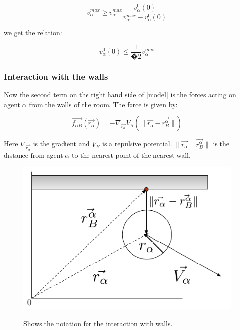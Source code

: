 \begin{equation}
	v_{\alpha}^{max} 
	\geq 
	v_{\alpha}^{max} 
	\frac{v_{\alpha}^{0}(0)}{v_{\alpha}^{max}-v_{\alpha}^{0}(0)}
\end{equation}

we get the relation:

\begin{equation}
v_{\alpha}^{0}(0)\leq \frac{1}{�2}v_{\alpha}^{max}
\end{equation}


\subsubsection{Interaction with the walls}
Now the second term on the right hand side of \eqref{model} is the forces acting on agent 
$\alpha$ from the walls of the room. The force is given by:

\begin{equation}
    \vec{f_{\alpha B}} \left( \vec{r_{\alpha}} \right) =
    - \nabla_{\vec{r_{\alpha}}} V_{B}
    \left( \| \vec{r_{\alpha}} - \vec{r_{B}^{\alpha}} \| \right)
\end{equation}

Here $\nabla_{\vec{r_{\alpha}}}$ is the gradient and $V_B$ is a repulsive 
potential. $ \| \vec{r_{\alpha}} - \vec{r_{B}^{\alpha}} \|$ is the distance 
from agent $\alpha$ to the nearest point of the nearest wall.

\begin{figure}[ht]
\centering
{\includegraphics[scale=0.35]{Figures/NotationOfWall.pdf}} 
\caption{\small{Shows the notation for the interaction with walls.}}
\label{NotationOfWall}
\end{figure}

